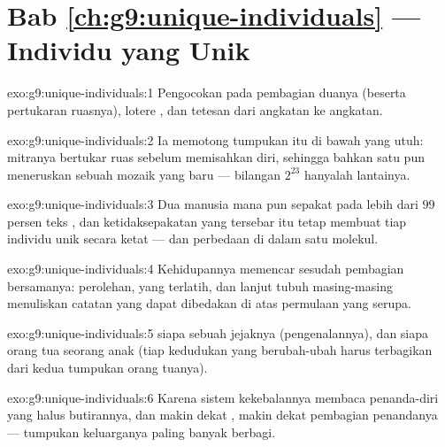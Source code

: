 \section*{Bab \ref{ch:g9:unique-individuals} --- Individu yang Unik}

\begin{solution}{exo:g9:unique-individuals:1}
Pengocokan pada pembagian duanya (beserta pertukaran
ruasnya), lotere , dan tetesan  dari
angkatan ke angkatan.
\end{solution}

\begin{solution}{exo:g9:unique-individuals:2}
Ia memotong tumpukan itu di bawah  yang utuh: mitranya
bertukar ruas sebelum memisahkan diri, sehingga bahkan satu
 pun meneruskan sebuah mozaik yang baru --- bilangan
$2^{23}$ hanyalah lantainya.
\end{solution}

\begin{solution}{exo:g9:unique-individuals:3}
Dua manusia mana pun sepakat pada lebih dari $99$ persen
teks , dan ketidaksepakatan yang tersebar itu tetap
membuat tiap individu unik secara ketat ---  dan
perbedaan di dalam satu molekul.
\end{solution}

\begin{solution}{exo:g9:unique-individuals:4}
Kehidupannya memencar sesudah pembagian bersamanya: 
perolehan,  yang terlatih, dan  lanjut tubuh
masing-masing menuliskan catatan yang dapat dibedakan di atas
permulaan yang serupa.
\end{solution}

\begin{solution}{exo:g9:unique-individuals:5}
 siapa sebuah jejaknya (pengenalannya), dan siapa orang
tua seorang anak (tiap kedudukan yang berubah-ubah harus
terbagikan dari kedua tumpukan orang tuanya).
\end{solution}

\begin{solution}{exo:g9:unique-individuals:6}
Karena sistem kekebalannya membaca penanda-diri yang halus
butirannya, dan makin dekat , makin dekat
pembagian penandanya --- tumpukan keluarganya paling banyak
berbagi.
\end{solution}

